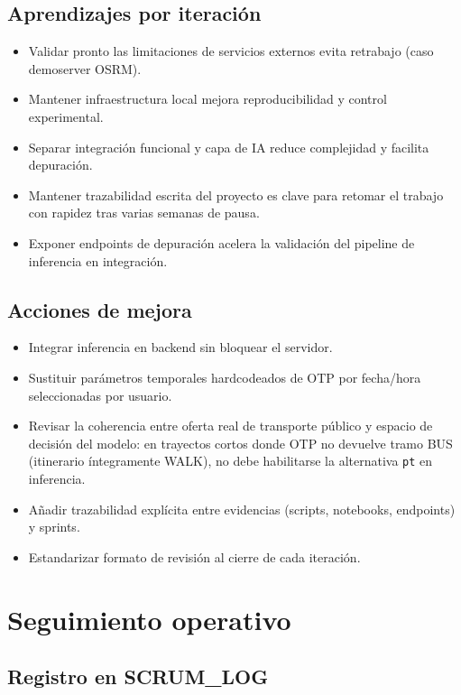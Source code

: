 \subsection{Aprendizajes por iteración}

\begin{itemize}
  \item Validar pronto las limitaciones de servicios externos evita retrabajo (caso demoserver OSRM).
  \item Mantener infraestructura local mejora reproducibilidad y control experimental.
  \item Separar integración funcional y capa de IA reduce complejidad y facilita depuración.
  \item Mantener trazabilidad escrita del proyecto es clave para retomar el trabajo con rapidez tras varias semanas de pausa.
  \item Exponer endpoints de depuración acelera la validación del pipeline de inferencia en integración.
\end{itemize}

\subsection{Acciones de mejora}

\begin{itemize}
  \item Integrar inferencia en backend sin bloquear el servidor.
  \item Sustituir parámetros temporales hardcodeados de OTP por fecha/hora seleccionadas por usuario.
  \item Revisar la coherencia entre oferta real de transporte público y espacio de decisión del modelo: en trayectos cortos donde OTP no devuelve tramo BUS (itinerario íntegramente WALK), no debe habilitarse la alternativa \texttt{pt} en inferencia.
  \item Añadir trazabilidad explícita entre evidencias (scripts, notebooks, endpoints) y sprints.
  \item Estandarizar formato de revisión al cierre de cada iteración.
\end{itemize}

\section{Seguimiento operativo}

\subsection{Registro en SCRUM\_LOG}

